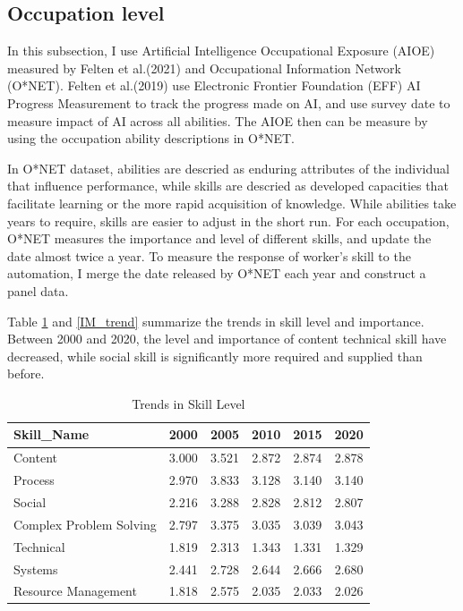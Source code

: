 \documentclass[12pt]{article}
\begin{document}
\subsection{Occupation level}

In this subsection, I use Artificial Intelligence Occupational Exposure (AIOE) measured by Felten et al.(2021)\cite{Feltenetal2021} and Occupational Information Network (O*NET). Felten et al.(2019)\cite{Feltenetal2019} use Electronic Frontier Foundation (EFF) AI Progress Measurement to track the progress made on AI, and use survey date to measure impact of AI across all abilities. The AIOE then can be measure by using the occupation ability descriptions in O*NET.

In O*NET dataset, abilities are descried as enduring attributes of the individual that influence performance, while skills are descried as developed capacities that facilitate learning or the more rapid acquisition of knowledge. While abilities take years to require, skills are easier to adjust in the short run. For each occupation, O*NET measures the importance and level of different skills, and update the date almost twice a year. To measure the response of worker's skill to the automation, I merge the date released by O*NET each year and construct a panel data. 

Table \ref{LV_trend} and \ref{IM_trend} summarize the trends in skill level and importance. Between 2000 and 2020, the level and importance of content technical skill have decreased, while social skill is significantly more required and supplied than before. 

\begin{table}
\center
\scriptsize
\caption{Trends in Skill Level}
\label{LV_trend}
\begin{tabular}{lccccc} \hline \hline
Skill\_Name & 2000 & 2005 & 2010 & 2015 & 2020 \\ \hline
Content & 3.000 & 3.521 & 2.872 & 2.874 & 2.878 \\
Process & 2.970 & 3.833 & 3.128 & 3.140 & 3.140 \\
Social & 2.216 & 3.288 & 2.828 & 2.812 & 2.807 \\
Complex Problem Solving & 2.797 & 3.375 & 3.035 & 3.039 & 3.043 \\
Technical & 1.819 & 2.313 & 1.343 & 1.331 & 1.329 \\
Systems & 2.441 & 2.728 & 2.644 & 2.666 & 2.680 \\
Resource Management & 1.818 & 2.575 & 2.035 & 2.033 & 2.026 \\ \hline
\end{tabular}
\end{table}
\end{document}
